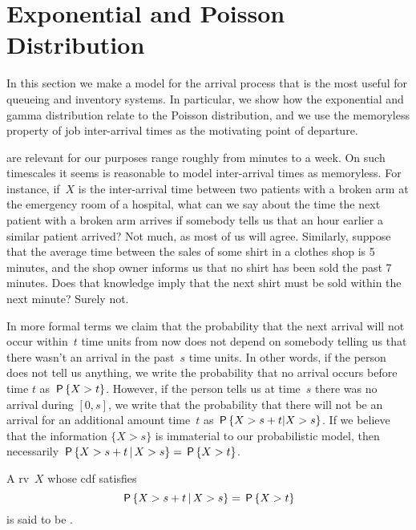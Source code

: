 \documentclass[stochastic-or.tex]{subfiles}
\begin{document}
\section{Exponential and Poisson Distribution}
\label{sec:expon-poiss-distr}

In this section we make a model for the arrival process that is the most useful for queueing and inventory systems.
In particular, we show how the exponential and gamma distribution relate to the Poisson distribution, and we use the memoryless property of job inter-arrival times as the motivating point of departure.



 are relevant for our purposes range roughly from minutes to a week.
On such timescales it seems is reasonable to model inter-arrival times as memoryless.
For instance, if~$X$ is the inter-arrival time between two patients with a broken arm at the emergency room of a hospital, what can we say about the time the next patient with a broken arm arrives if somebody tells us that an hour earlier a similar patient arrived?
Not much, as most of us will agree.
Similarly, suppose that the average time between the sales of some shirt in a clothes shop is 5 minutes, and the shop owner informs us that no shirt has been sold the past 7 minutes.
Does that knowledge imply that the next shirt must be sold within the next minute?
Surely not.

In more formal terms we claim that the probability that the next arrival will not occur within~$t$ time units from now does not depend on somebody telling us that there wasn't an arrival in the past~$s$ time units.
In other words, if the person does not tell us anything, we write the probability that no arrival occurs before time $t$ as $\P{X>t}$.
However, if the person tells us at time~$s$ there was no arrival during $[0,s]$, we write that the probability that there will not be an arrival for an additional amount time~$t$ as $\P{X>s+t|X>s}$.
If we believe that the information $\{X>s\}$ is immaterial to our probabilistic model, then necessarily $\P{X > s+t \given X>s} = \P{X>t}$.

\begin{definition}
A rv~$X$ whose cdf satisfies
\begin{equation}\label{eq:29}
 \P{X > s+t \given X>s} = \P{X>t}
\end{equation}
is said to be .
\end{definition}
\end{document}
